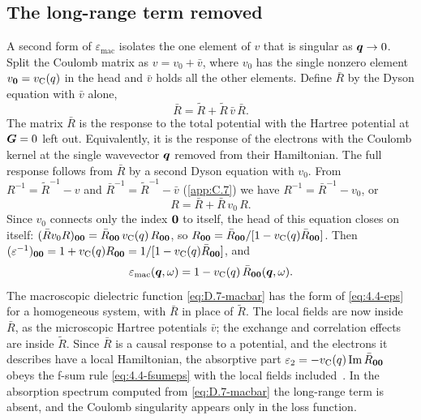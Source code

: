 \subsection*{The long-range term removed}

A second form of $\varepsilon_{\mathrm{mac}}$ isolates the one element of $v$ that is singular as $\bm{q} \to 0$. Split the Coulomb matrix as $v = v_0 + \bar v$, where $v_0$ has the single nonzero element $v_{\bm{0}} = v_{\mathrm{C}}(q)$ in the head and $\bar v$ holds all the other elements. Define $\bar R$ by the Dyson equation with $\bar v$ alone,
\begin{equation}
  \bar R = \tilde R + \tilde R\,\bar v\,\bar R .
  \label{eq:D.7-Rbar}
\end{equation}
The matrix $\bar R$ is the response to the total potential with the Hartree potential at $\bm{G} = 0$ left out. Equivalently, it is the response of the electrons with the Coulomb kernel at the single wavevector $\bm{q}$ removed from their Hamiltonian. The full response follows from $\bar R$ by a second Dyson equation with $v_0$. From $R^{-1} = \tilde R^{-1} - v$ and $\bar R^{-1} = \tilde R^{-1} - \bar v$ (\cref{app:C.7}) we have $R^{-1} = \bar R^{-1} - v_0$, or
\begin{equation*}
  R = \bar R + \bar R\,v_0\,R .
\end{equation*}
Since $v_0$ connects only the index $\bm{0}$ to itself, the head of this equation closes on itself: $(\bar Rv_0R)_{\bm{0}\bm{0}} = \bar R_{\bm{0}\bm{0}}\,v_{\mathrm{C}}(q)\,R_{\bm{0}\bm{0}}$, so $R_{\bm{0}\bm{0}} = \bar R_{\bm{0}\bm{0}}/[1 - v_{\mathrm{C}}(q)\bar R_{\bm{0}\bm{0}}]$. Then $(\varepsilon^{-1})_{\bm{0}\bm{0}} = 1 + v_{\mathrm{C}}(q)R_{\bm{0}\bm{0}} = 1/[1 - v_{\mathrm{C}}(q)\bar R_{\bm{0}\bm{0}}]$, and
\begin{equation}
  \varepsilon_{\mathrm{mac}}(\bm{q},\omega) = 1 - v_{\mathrm{C}}(q)\,\bar R_{\bm{0}\bm{0}}(\bm{q},\omega) .
  \label{eq:D.7-macbar}
\end{equation}
The macroscopic dielectric function \cref{eq:D.7-macbar} has the form of \cref{eq:4.4-eps} for a homogeneous system, with $\bar R$ in place of $\tilde R$. The local fields are now inside $\bar R$, as the microscopic Hartree potentials $\bar v$; the exchange and correlation effects are inside $\tilde R$. Since $\bar R$ is a causal response to a potential, and the electrons it describes have a local Hamiltonian, the absorptive part $\varepsilon_2 = -v_{\mathrm{C}}(q)\operatorname{Im}\bar R_{\bm{0}\bm{0}}$ obeys the f-sum rule \cref{eq:4.4-fsumeps} with the local fields included~\cite{onida2002electronic}. In the absorption spectrum computed from \cref{eq:D.7-macbar} the long-range term is absent, and the Coulomb singularity appears only in the loss function.

